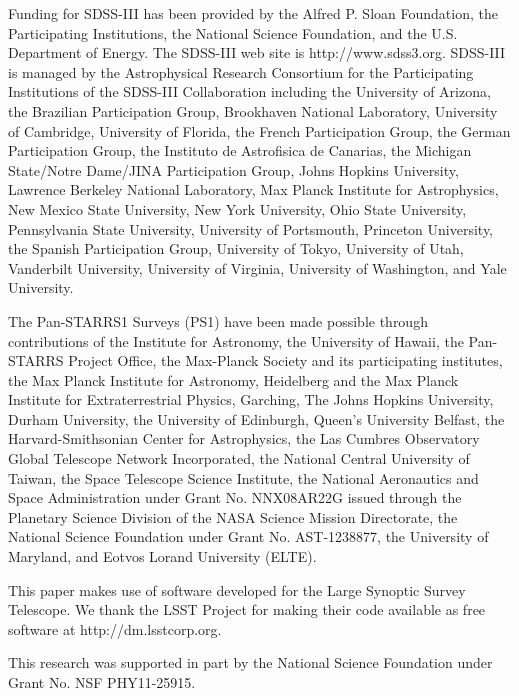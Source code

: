 \documentclass[a4paper,fleqn,usenatbib]{mnras}
\begin{document}
  Funding for SDSS-III has been provided by the Alfred P. Sloan Foundation, the
  Participating Institutions, the National Science Foundation, and the U.S.  Department of
  Energy. The SDSS-III web site is http://www.sdss3.org.  SDSS-III is managed by the
  Astrophysical Research Consortium for the Participating Institutions of the SDSS-III
  Collaboration including the University of Arizona, the Brazilian Participation Group,
  Brookhaven National Laboratory, University of Cambridge, University of Florida, the
  French Participation Group, the German Participation Group, the Instituto de Astrofisica
  de Canarias, the Michigan State/Notre Dame/JINA Participation Group, Johns Hopkins
  University, Lawrence Berkeley National Laboratory, Max Planck Institute for
  Astrophysics, New Mexico State University, New York University, Ohio State University,
  Pennsylvania State University, University of Portsmouth, Princeton University, the
  Spanish Participation Group, University of Tokyo, University of Utah, Vanderbilt
  University, University of Virginia, University of Washington, and Yale University.
  
  The Pan-STARRS1 Surveys (PS1) have been made possible through contributions of the 
  Institute for Astronomy, the University of Hawaii, the Pan-STARRS Project Office, 
  the Max-Planck Society and its participating institutes, the Max Planck Institute 
  for Astronomy, Heidelberg and the Max Planck Institute for Extraterrestrial Physics, 
  Garching, The Johns Hopkins University, Durham University, the University of Edinburgh, 
  Queen's University Belfast, the Harvard-Smithsonian Center for Astrophysics, the Las 
  Cumbres Observatory Global Telescope Network Incorporated, the National Central 
  University of Taiwan, the Space Telescope Science Institute, the National Aeronautics 
  and Space Administration under Grant No. NNX08AR22G issued through the Planetary 
  Science Division of the NASA Science Mission Directorate, the National Science 
  Foundation under Grant No. AST-1238877, the University of Maryland, and Eotvos 
  Lorand University (ELTE).
  
  This paper makes use of software developed for the Large Synoptic Survey 
  Telescope. We thank the LSST Project for making their code available as free 
  software at http://dm.lsstcorp.org.
 
  This research was supported in part by the National Science Foundation under Grant 
  No. NSF PHY11-25915. 
  
\end{document}
